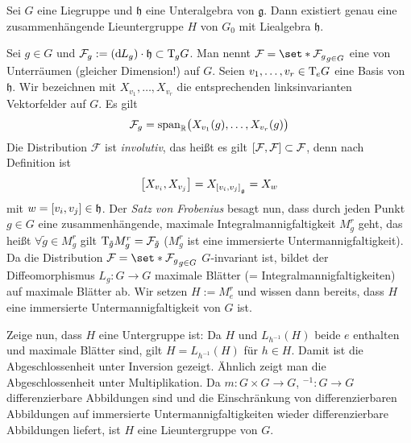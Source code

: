 \begin{satz}[label=satz:125,{name=[Lieuntergruppe zu Lieunteralgebra]}]
	Sei $G$ eine Liegruppe und $\mathfrak{h}$ eine Unteralgebra von $\mathfrak{g}$.
	Dann existiert genau eine zusammenhängende Lieuntergruppe $H$ von $G_0$ mit Liealgebra $\mathfrak{h}$. 
\end{satz}
\begin{beweis}
	Sei $g \in G$ und $\mathcal{F}_g := (\mathd L_g) \cdot \mathfrak{h} \subset \Tmap_g G$.
	Man nennt $\mathcal{F} = \set*{\mathcal{F}_g}_{g \in G}$ eine  von Unterräumen (gleicher Dimension!) auf $G$.
	Seien $v_1, \ldots ,v_r \in \Tmap_e G$ eine Basis von $\mathfrak{h}$.
	Wir bezeichnen mit $X_{v_1}, \ldots ,X_{v_r}$ die entsprechenden linksinvarianten Vektorfelder auf $G$.
	Es gilt
	\[
		\mathcal{F}_g = \Span_\mathbb{R} \enbrace[\big]{X_{v_1}(g), \ldots , X_{v_r}(g)}
	\]
	Die Distribution $\mathcal{F}$ ist \emph{involutiv}, das heißt es gilt $\benbrace*{\mathcal{F},\mathcal{F}} \subset \mathcal{F}$, denn nach Definition ist
	\[
		\benbrace[\big]{X_{v_i}, X_{v_j}} = X_{\benbrace*{v_i,v_j}_{\mathfrak{g}}} = X_w
	\]
	mit $w= \benbrace*{v_i,v_j} \in \mathfrak{h}$.
	Der \emph{Satz von Frobenius} \cite{LeeSmooth} besagt nun, dass durch jeden Punkt $g \in G$ eine zusammenhängende, maximale Integralmannigfaltigkeit $M^r_g$ geht, das heißt $\forall \tilde{g} \in M^r_g$ gilt $\Tmap_{\tilde{g}} M^r_g = \mathcal{F}_{\tilde{g}}$
	($M^r_g$ ist eine immersierte Untermannigfaltigkeit).
	Da die Distribution $\mathcal{F} = \set*{\mathcal{F}_g}_{g \in G}$ $G$-invariant ist, bildet der Diffeomorphismus $L_g \colon G \to G$ maximale Blätter (= Integralmannigfaltigkeiten) auf maximale Blätter ab.
	Wir setzen $H := M^r_e$ und wissen dann bereits, dass $H$ eine immersierte Untermannigfaltigkeit von $G$ ist.
	
	Zeige nun, dass $H$ eine Untergruppe ist:
	Da $H$ und $L_{h^{-1}}(H)$ beide $e$ enthalten und maximale Blätter sind, gilt $H=L_{h^{-1}}(H)$ für $h \in H$.
	Damit ist die Abgeschlossenheit unter Inversion gezeigt.
	Ähnlich zeigt man die Abgeschlossenheit unter Multiplikation.
	Da $m \colon G  \times G \to G$, $^{-1} \colon G \to G$ differenzierbare Abbildungen sind und die Einschränkung von differenzierbaren Abbildungen auf immersierte Untermannigfaltigkeiten wieder differenzierbare Abbildungen liefert, ist $H$ eine Lieuntergruppe von $G$.
	

\end{beweis}
